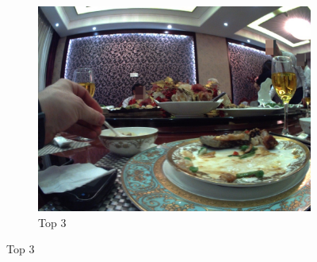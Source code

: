 \begin{figure}[H]
\begin{subfigure}{0.32\textwidth}
          \includegraphics[width=\textwidth]{Sections/7Results/images/run2top3.jpg}\hfill
            \caption{Top 3}
        \end{subfigure} \par\medskip



\end{figure}
